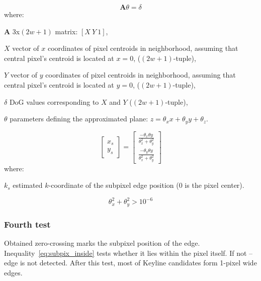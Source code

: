 \begin{equation}
\bm{A}\theta = \delta
\label{eq:regress}
\end{equation}
where:
\begin{eqwhere}[2cm]
	\item[$\bm{A}$] 3x$(2w+1)$ matrix: $[X\ Y\ 1]$,
	\item[$X$] vector of $x$ coordinates of pixel centroids in neighborhood, assuming that central pixel's centroid is located at $x = 0$, ($(2w+1)$-tuple),
	\item[$Y$] vector of $y$ coordinates of pixel centroids in neighborhood, assuming that central pixel's centroid is located at $y = 0$, ($(2w+1)$-tuple),
	\item[$\delta$] DoG values corresponding to $X$ and $Y$ ($(2w+1)$-tuple),
	\item[$\theta$] parameters defining the approximated plane: $z = \theta_{x}x + \theta_{y}y + \theta_{z}$.
\end{eqwhere}



\begin{equation}
\begin{bmatrix}
x_s \\
y_s 
\end{bmatrix} = 
\begin{bmatrix}
\frac{-\theta_{x} \theta{y}}{\theta_x^2 + \theta_y^2} \\
\frac{-\theta_{y} \theta{y}}{\theta_x^2 + \theta_y^2}
\end{bmatrix}
\label{eq:zerocross}
\end{equation}
where:
\begin{eqwhere}[2cm]
	\item[$k_s$] estimated $k$-coordinate of the subpixel edge position (0 is the pixel center).
\end{eqwhere}

\begin{equation}
\theta_{x}^2 + \theta_{y}^2 > 10^{-6}
\label{eq:test3}
\end{equation}

\subsubsection{Fourth test}
\label{edge_fourth}

Obtained zero-crossing marks the subpixel position of the edge. Inequality~\ref{eq:subpix_inside} tests whether it lies within the pixel itself. If not -- edge is not detected. After this test, most of Keyline candidates form 1-pixel wide edges.


